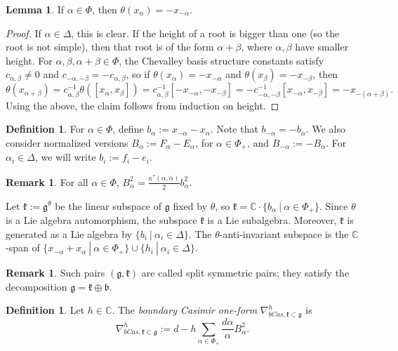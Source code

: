 \documentclass[10pt]{amsart}
\numberwithin{equation}{section}
\theoremstyle{definition}
\newtheorem{lemma}[theorem]{Lemma}
\newtheorem{remark}[theorem]{Remark}
\newtheorem{definition}[theorem]{Definition}
\def\C{{\mathbb C}}
\newcommand{\g}{\mathfrak{g}}
\newcommand{\borel}{\mathfrak{b}}
\newcommand{\kompact}{\mathfrak{k}}
\begin{document}
\begin{lemma}
    If $\alpha \in \Phi$, then $\theta(x_{\alpha})= -x_{-\alpha}$.
\end{lemma}
\begin{proof}
    If $\alpha\in \Delta$, this is clear. If the height of a root is bigger than one (so the root is not simple), then that root is of the form $\alpha+\beta$, where $\alpha, \beta$ have smaller height. For $\alpha, \beta, \alpha+\beta\in \Phi$, the Chevalley basis structure constants satisfy $c_{\alpha,\beta}\ne 0$ and $c_{-\alpha, -\beta} = - c_{\alpha, \beta}$, so if $\theta(x_{\alpha})=-x_{-\alpha}$ and $\theta(x_{\beta})= -x_{-\beta}$, then
    \[
    \theta(x_{\alpha+\beta})= c_{\alpha,\beta}^{-1}\theta([x_{\alpha},x_{\beta}]) = c_{\alpha,\beta}^{-1}[-x_{-\alpha},-x_{-\beta}] = -c_{-\alpha,-\beta}^{-1}[x_{-\alpha},x_{-\beta}] = -x_{-(\alpha+\beta)}.
    \]
    Using the above, the claim follows from induction on height. 
\end{proof}


\begin{definition}
    For $\alpha\in \Phi$, define $b_{\alpha}:= x_{-\alpha} - x_{\alpha}$. Note that $b_{-\alpha} = -b_{\alpha}$. We also consider normalized versions $B_{\alpha}:=F_{\alpha}-E_{\alpha}$, for $\alpha\in \Phi_+$, and $B_{-\alpha}:=-B_{\alpha}$. For $\alpha_i\in \Delta$, we will write $b_{i}:=f_i-e_i$.
\end{definition}

\begin{remark}
    For all $\alpha\in \Phi$, $B_{\alpha}^2=\frac{\kappa^*(\alpha, \alpha)}{2}b_{\alpha}^2$.
\end{remark}

Let $\kompact:=\g^{\theta}$ be the linear subspace of $\g$ fixed by $\theta$, so $\kompact = \C\cdot\{b_{\alpha} \ | \ \alpha \in \Phi_+\}$. Since $\theta$ is a Lie algebra automorphism, the subspace $\kompact$ is a Lie subalgebra. Moreover, $\kompact$ is generated as a Lie algebra by $\{b_{i} \ | \ \alpha_i\in \Delta\}$. The $\theta$-anti-invariant subspace is the $\C$-span of $\{x_{-\alpha}+x_{\alpha} \ | \ \alpha \in \Phi_+\}\cup\{h_i \ | \ \alpha_i \in \Delta\}$.

\begin{remark}
    Such pairs $(\g, \kompact)$ are called split symmetric pairs; they satisfy the decomposition $\g= \kompact \oplus \borel$.
\end{remark} 

\begin{definition}
    Let $h\in \mathbb{C}$. The \emph{boundary Casimir one-form} $\nabla_{bCas, \kompact\subset \g}^{h}$ is
    \begin{equation}
    \nabla_{bCas, \kompact\subset \g}^{h}:= d- h\sum_{\alpha\in \Phi_+}\frac{d\alpha}{\alpha}B_{\alpha}^2. 
    \end{equation}
\end{definition}
\end{document}
